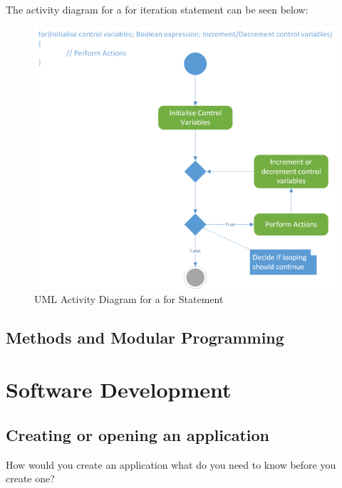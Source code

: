 \documentclass[
]{book}
\begin{document}
The activity diagram for a for iteration statement can be seen below:

\begin{figure}

{\centering \includegraphics[width=1\linewidth]{images/for} 

}

\caption{UML Activity Diagram for a for Statement}\label{fig:unnamed-chunk-13}
\end{figure}

\hypertarget{methods-and-modular-programming}{%
\subsection{Methods and Modular Programming}\label{methods-and-modular-programming}}

\hypertarget{software-development}{%
\section{Software Development}\label{software-development}}

\hypertarget{creating-or-opening-an-application}{%
\subsection{Creating or opening an application}\label{creating-or-opening-an-application}}

How would you create an application what do you need to know before you create one?
\end{document}
